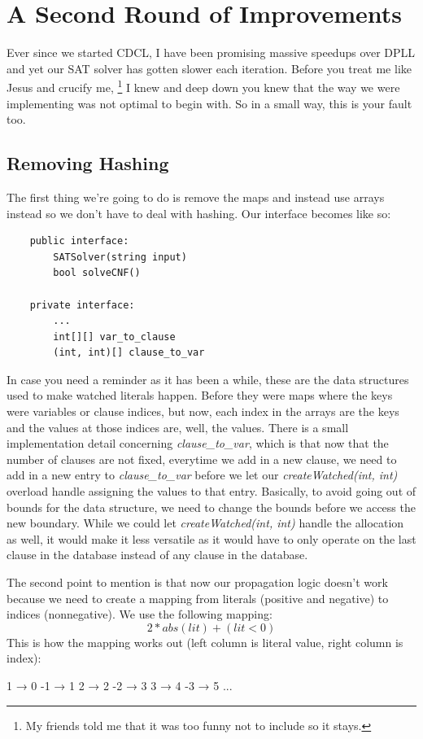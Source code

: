 \section{A Second Round of Improvements}

Ever since we started CDCL, I have been promising massive speedups over DPLL 
and yet our SAT solver has gotten slower each iteration. Before you treat me 
like Jesus and crucify me,
\footnote{My friends told me that it was too funny not to include so it stays.}
I knew and deep down you knew that the way we were implementing was not optimal
to begin with. So in a small way, this is your fault too. 

\subsection{Removing Hashing}

The first thing we're going to do is remove the maps and instead use arrays 
instead so we don't have to deal with hashing. Our interface becomes like so:

\begin{lstlisting}
    public interface:
        SATSolver(string input)
        bool solveCNF()

    private interface:
        ...
        int[][] var_to_clause
        (int, int)[] clause_to_var
\end{lstlisting}

In case you need a reminder as it has been a while, these are the data structures 
used to make watched literals happen. Before they were maps where the keys were variables 
or clause indices, but now, each index in the arrays are the keys and the values at those 
indices are, well, the values. There is a small implementation detail concerning 
\textit{clause\_to\_var}, which is that now that the number of clauses are not fixed, 
everytime we add in a new clause, we need to add in a new entry to \textit{clause\_to\_var}
before we let our \textit{createWatched(int, int)} overload handle assigning the values 
to that entry. Basically, to avoid going out of bounds for the data structure, we need to 
change the bounds before we access the new boundary. While we could let 
\textit{createWatched(int, int)} handle the allocation as well, it would make it less 
versatile as it would have to only operate on the last clause in the database instead of 
any clause in the database.

The second point to mention is that now our propagation logic doesn't work because we 
need to create a mapping from literals (positive and negative) to indices (nonnegative).
We use the following mapping:
$$ 2 * abs(lit) + (lit < 0) $$
This is how the mapping works out (left column is literal value, right column is index):
\begin{FVerbatim}
 1 → 0
-1 → 1
 2 → 2
-2 → 3
 3 → 4
-3 → 5
  ...
\end{FVerbatim}

